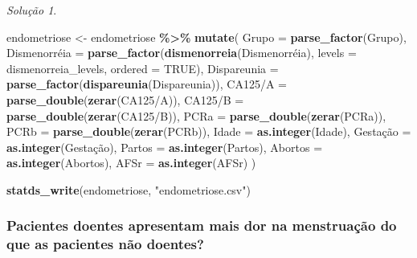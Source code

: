 \documentclass[
]{latex/krantz}
\newenvironment{Shaded}{\begin{snugshade}}{\end{snugshade}}
\newcommand{\AttributeTok}[1]{\textcolor[rgb]{0.13,0.29,0.53}{#1}}
\newcommand{\ConstantTok}[1]{\textcolor[rgb]{0.56,0.35,0.01}{#1}}
\newcommand{\FunctionTok}[1]{\textcolor[rgb]{0.13,0.29,0.53}{\textbf{#1}}}
\newcommand{\NormalTok}[1]{#1}
\newcommand{\OtherTok}[1]{\textcolor[rgb]{0.56,0.35,0.01}{#1}}
\newcommand{\SpecialCharTok}[1]{\textcolor[rgb]{0.81,0.36,0.00}{\textbf{#1}}}
\newcommand{\StringTok}[1]{\textcolor[rgb]{0.31,0.60,0.02}{#1}}
\theoremstyle{definition}
\theoremstyle{definition}
\theoremstyle{definition}
\theoremstyle{definition}
\theoremstyle{remark}
\newtheorem*{solution}{Solução}
\begin{document}
\begin{solution}
\begin{Shaded}
\begin{Highlighting}[]
\NormalTok{endometriose }\OtherTok{\textless{}{-}}\NormalTok{ endometriose }\SpecialCharTok{\%\textgreater{}\%}
                  \FunctionTok{mutate}\NormalTok{(}
                    \AttributeTok{Grupo =} \FunctionTok{parse\_factor}\NormalTok{(Grupo),}
\NormalTok{                    Dismenorréia }\OtherTok{=} \FunctionTok{parse\_factor}\NormalTok{(}\FunctionTok{dismenorreia}\NormalTok{(Dismenorréia), }\AttributeTok{levels =}\NormalTok{ dismenorreia\_levels, }\AttributeTok{ordered =} \ConstantTok{TRUE}\NormalTok{),}
                    \AttributeTok{Dispareunia =} \FunctionTok{parse\_factor}\NormalTok{(}\FunctionTok{dispareunia}\NormalTok{(Dispareunia)),}
                    \StringTok{\textasciigrave{}}\AttributeTok{CA125/A}\StringTok{\textasciigrave{}} \OtherTok{=} \FunctionTok{parse\_double}\NormalTok{(}\FunctionTok{zerar}\NormalTok{(}\StringTok{\textasciigrave{}}\AttributeTok{CA125/A}\StringTok{\textasciigrave{}}\NormalTok{)),}
                    \StringTok{\textasciigrave{}}\AttributeTok{CA125/B}\StringTok{\textasciigrave{}} \OtherTok{=} \FunctionTok{parse\_double}\NormalTok{(}\FunctionTok{zerar}\NormalTok{(}\StringTok{\textasciigrave{}}\AttributeTok{CA125/B}\StringTok{\textasciigrave{}}\NormalTok{)),}
                    \AttributeTok{PCRa =} \FunctionTok{parse\_double}\NormalTok{(}\FunctionTok{zerar}\NormalTok{(PCRa)),}
                    \AttributeTok{PCRb =} \FunctionTok{parse\_double}\NormalTok{(}\FunctionTok{zerar}\NormalTok{(PCRb)),}
                    \AttributeTok{Idade =} \FunctionTok{as.integer}\NormalTok{(Idade),}
\NormalTok{                    Gestação }\OtherTok{=} \FunctionTok{as.integer}\NormalTok{(Gestação),}
                    \AttributeTok{Partos =} \FunctionTok{as.integer}\NormalTok{(Partos),}
                    \AttributeTok{Abortos =} \FunctionTok{as.integer}\NormalTok{(Abortos),}
                    \AttributeTok{AFSr =} \FunctionTok{as.integer}\NormalTok{(AFSr)}
\NormalTok{                  )}

\FunctionTok{statds\_write}\NormalTok{(endometriose, }\StringTok{"endometriose.csv"}\NormalTok{)}
\end{Highlighting}
\end{Shaded}

\hypertarget{pacientes-doentes-apresentam-mais-dor-na-menstruauxe7uxe3o-do-que-as-pacientes-nuxe3o-doentes}{%
\subsubsection*{Pacientes doentes apresentam mais dor na menstruação do que as pacientes não doentes?}\label{pacientes-doentes-apresentam-mais-dor-na-menstruauxe7uxe3o-do-que-as-pacientes-nuxe3o-doentes}}


\end{solution}
\end{document}
